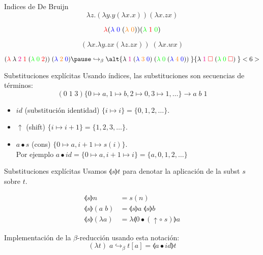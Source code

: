 
\begin{frame}{Indices de De Bruijn}
	\[ \lambda z. (\lambda y. y (\lambda x. x)) (\lambda x. z x) \]
	
	\pause
	\[ \textcolor{red}{\lambda} (\textcolor{blue}{\lambda\; 0} \; (\textcolor{orange}{\lambda\; 0})) (\textcolor{green}{\lambda}\; \textcolor{red}{1} \; \textcolor{green}{0}) \]
	
	\pause
	\[ (\lambda x. \lambda y. z x (\lambda z. z x)) \; (\lambda x. w x) \]
	
	\pause
	\[
	(\textcolor{red}{\lambda}\; \lambda\; \textcolor{magenta}{2}\; \textcolor{red}{1}\; (\textcolor{green}{\lambda\; 0}\; \textcolor{red}{2}))\; (\textcolor{blue}{\lambda}\; \textcolor{orange}{2}\; \textcolor{blue}{0})
	\pause
	\hookrightarrow_\beta
	\alt{
		\lambda \; \textcolor{magenta}{1} \; (\textcolor{blue}{\lambda}\; \textcolor{orange}{3}\; \textcolor{blue}{0})\; (\textcolor{green}{\lambda\; 0}\; (\textcolor{blue}{\lambda}\; \textcolor{orange}{4}\; \textcolor{blue}{0}))\;
	}{
		\lambda \; \textcolor{magenta}{1} \; \textcolor{red}{\square} \; (\textcolor{green}{\lambda\; 0}\; \textcolor{red}{\square})\;
	}<6>
	\]
\end{frame}

\begin{frame}{Substituciones explícitas}
	Usando índices, las substituciones son secuencias de términos:
	\[ (0\; 1\; 3)\{0\mapsto a, 1\mapsto b, 2\mapsto 0, 3\mapsto 1, \dots \} \rightarrow a\; b\; 1 \]
	
	\pause
	\begin{itemize}[<+->]
		\item $id$ (substitución identidad) $\{i \mapsto i\} = \{0, 1, 2, \dots \}$.
		\item $\uparrow$ (shift) $\{i \mapsto i+1\} = \{1, 2, 3, \dots \}$.
		\item $a \bullet s$ (cons) $\{0 \mapsto a, i+1 \mapsto s(i)\}$. \\ Por ejemplo $a \bullet id = \{ 0 \mapsto a, i+1 \mapsto i \} = \{ a, 0, 1, 2, \dots \}$
	\end{itemize}
\end{frame}

\begin{frame}{Substituciones explícitas}
	Usamos $\llangle s \rrangle t$ para denotar la aplicación de la subst $s$ sobre $t$.

	\pause
	\begin{align*}
		\llangle s \rrangle n &= s(n) \\
		\llangle s \rrangle (a\; b) &= \llangle s \rrangle a\; \llangle s \rrangle b \\
		\llangle s \rrangle (\lambda a) &= \lambda \llangle 0 \bullet (\uparrow \circ\; s) \rrangle a
	\end{align*}
	
	\pause
	Implementación de la $\beta$-reducción usando esta notación:
	\[ (\lambda t)\; a \hookrightarrow_\beta t[a] = \llangle a \bullet id \rrangle t \]
\end{frame}

